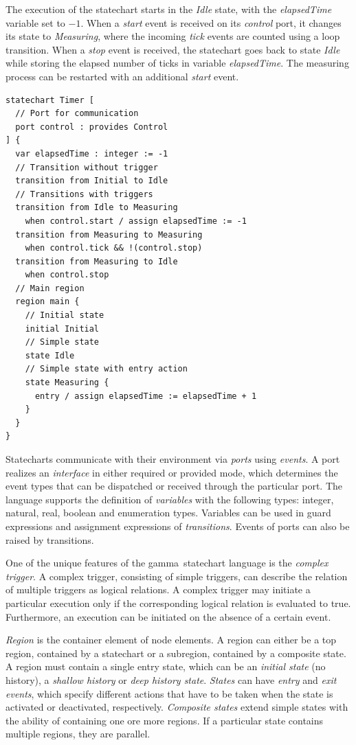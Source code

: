 \documentclass[conference]{IEEEtran}
\renewcommand{\gamma}[0]{\textsf{gamma}}
\begin{document}
The execution of the statechart starts in the \textsl{Idle} state, with the \textsl{elapsedTime} variable set to $-1$. When a \textsl{start} event is received on its \textsl{control} port, it changes its state to \textsl{Measuring}, where the incoming \textsl{tick} events are counted using a loop transition. When a \textsl{stop} event is received, the statechart goes back to state \textsl{Idle} while storing the elapsed number of ticks in variable \textsl{elapsedTime}. The measuring process can be restarted with an additional \textsl{start} event.
\begin{lstlisting}
statechart Timer [
  // Port for communication
  port control : provides Control
] {
  var elapsedTime : integer := -1
  // Transition without trigger
  transition from Initial to Idle 
  // Transitions with triggers
  transition from Idle to Measuring
    when control.start / assign elapsedTime := -1
  transition from Measuring to Measuring
    when control.tick && !(control.stop)
  transition from Measuring to Idle
    when control.stop
  // Main region
  region main {
    // Initial state
    initial Initial
    // Simple state
    state Idle
    // Simple state with entry action
    state Measuring {
      entry / assign elapsedTime := elapsedTime + 1
    }		
  }
}
\end{lstlisting}

Statecharts communicate with their environment via \textsl{ports} using \textsl{events}. A port realizes an \textsl{interface} in either required or provided mode, which determines the event types that can be dispatched or received through the particular port. The language supports the definition of \textsl{variables} with the following types: integer, natural, real, boolean and enumeration types. Variables can be used in guard expressions and assignment expressions of \textsl{transitions}. Events of ports can also be raised by transitions.

One of the unique features of the \gamma\ statechart language is the \textsl{complex trigger}. A complex trigger, consisting of simple triggers, can describe the relation
of multiple triggers as logical relations. A complex trigger may initiate a particular execution only if the corresponding logical relation is evaluated to true. Furthermore, an execution can be
initiated on the absence of a certain event.

\textsl{Region} is the container element of node elements. A region can either be a top region, contained by a statechart or a subregion,
contained by a composite state. A region must contain a single entry state, which can be an \textsl{initial state} (no history), a \textsl{shallow history} or \textsl{deep history state}. \textsl{States} can have \textsl{entry} and
\textsl{exit events}, which specify different actions that have to be taken when the state is activated
or deactivated, respectively. \textsl{Composite states} extend simple states with the ability of containing
one ore more regions. If a particular state contains multiple regions, they are parallel.
\end{document}
